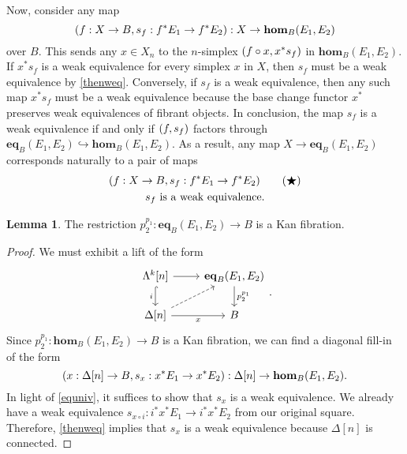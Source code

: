 \documentclass[10pt,letterpaper,cm]{nupset}
\theoremstyle{definition}
\theoremstyle{theorem}
\newtheorem{lemma}[definition]{Lemma}
\theoremstyle{remark}
\newcommand{\0}{\mathbf{0}}
\newcommand{\1}{\mathbf{1}}
\newcommand{\2}{\mathbf{2}}
\begin{document}
Now, consider any map $$\mleft(f:X \to B, s_f : f^{\ast}{E_1} \to f^{\ast}{E_2}\mright) : X \to  \mathbf{hom}_B(E_1, E_2)$$ over $B$. This sends any $x\in X_n$ to the $n$-simplex $\mleft(f\circ x, x^{\ast}{s_f}\mright)$ in $\mathbf{hom}_B(E_1, E_2)$. If $x^{\ast}{s_f}$ is a weak equivalence for every simplex $x$ in $X$, then $s_f$ must be a weak equivalence by \cref{thenweq}. Conversely, if $s_f$ is a weak equivalence, then any such  map $x^{\ast}{s_f}$ must be a weak equivalence because the base change functor $x^{\ast}$ preserves weak equivalences of fibrant objects. In conclusion, the map $s_f$ is a weak equivalence if and only if $\mleft(f,s_f\mright)$ factors through $\mathbf{eq}_B(E_1, E_2) \hookrightarrow  \mathbf{hom}_B(E_1, E_2)$. As a result, any map $X \to \mathbf{eq}_B(E_1, E_2)$ corresponds naturally to a pair of maps
\begin{gather*}
\label{equniv} \mleft(f: X\to B, s_f : f^{\ast}{E_1} \to f^{\ast}{E_2}\mright) \tag{$\bigstar$}
\\ s_f \text{ is a weak equivalence}.
\end{gather*}



\begin{lemma}\label{restKfib}
The restriction $p_2^{p_1}: \mathbf{eq}_B(E_1, E_2)\to B$ is a Kan fibration.
\end{lemma}
\begin{proof}
We must exhibit a lift of the form
\[
\begin{tikzcd}
{\Lambda^k[n]} \arrow[d, "i"', hook] \arrow[r] & {\mathbf{eq}_B(E_1, E_2)} \arrow[d, "p_2^{p_1}"] \\
{\Delta[n]} \arrow[r, "x"'] \arrow[ru, dashed] & B                                  
\end{tikzcd}.
\] Since $p_2^{p_1}: \mathbf{hom}_B(E_1, E_2)\to B$ is a Kan fibration, we can find a diagonal fill-in of the form $$\mleft(x: \Delta[n] \to B, s_x: x^{\ast}{E_1}\to x^{\ast}{E_2}\mright) : \Delta[n] \to \mathbf{hom}_B(E_1, E_2).$$ In light of \eqref{equniv}, it suffices to show that $s_x$ is a weak equivalence. We already have a weak equivalence $s_{x\circ i} : i^{\ast}{x^{\ast}{E_1}}\to i^{\ast}{x^{\ast}{E_2}}$ from our original square. Therefore, \cref{thenweq} implies that $s_x$ is a weak equivalence because $\Delta[n]$ is connected.
\end{proof}

\medskip
\end{document}
